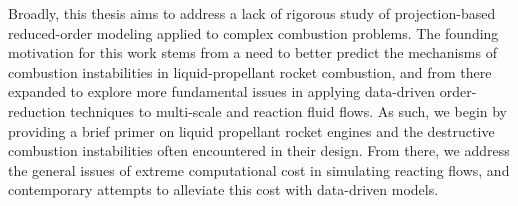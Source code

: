 
Broadly, this thesis aims to address a lack of rigorous study of projection-based reduced-order modeling applied to complex combustion problems. The founding motivation for this work stems from a need to better predict the mechanisms of combustion instabilities in liquid-propellant rocket combustion, and from there expanded to explore more fundamental issues in applying data-driven order-reduction techniques to multi-scale and reaction fluid flows. As such, we begin by providing a brief primer on liquid propellant rocket engines and the destructive combustion instabilities often encountered in their design. From there, we address the general issues of extreme computational cost in simulating reacting flows, and contemporary attempts to alleviate this cost with data-driven models.
